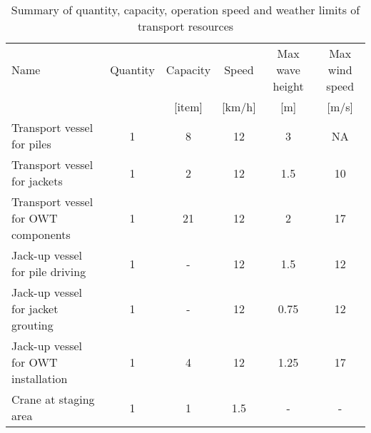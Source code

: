 \begin{table}
\label{tab:ressources}
\begin{tabular}{lccccc}
\hline 
Name & Quantity & Capacity & Speed & Max wave height & Max wind speed \\
& & [item] & [km/h] & [m] & [m/s] \\ 
\hline 
Transport vessel for piles & 1 & 8 & 12 & 3 & NA \\ 
Transport vessel for jackets & 1 & 2 & 12 & 1.5 & 10 \\ 
Transport vessel for OWT components & 1 & 21 & 12 & 2 & 17 \\ 
Jack-up vessel for pile driving & 1 & - & 12 & 1.5 & 12\\
Jack-up vessel for jacket grouting & 1 & - & 12 & 0.75 & 12\\
Jack-up vessel for OWT installation & 1 & 4 & 12 & 1.25 & 17 \\
Crane at staging area & 1 & 1 & 1.5 & - & - \\
\hline 
\end{tabular}

\caption{Summary of quantity, capacity, operation speed and weather limits of transport resources}
\end{table}
